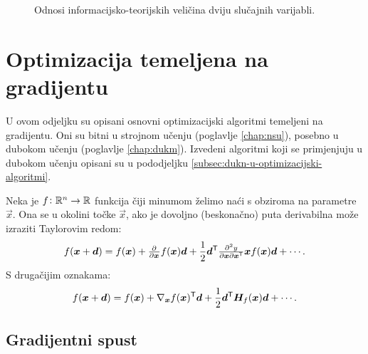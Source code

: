 \documentclass[utf8, diplomski, lmodern]{fer}
\begin{document}
\begin{figure}
\centering
{}
\caption{Odnosi informacijsko-teorijskih veličina dviju slučajnih varijabli.}
\label{fig:entropije}
\end{figure}


\section{Optimizacija temeljena na gradijentu}

U ovom odjeljku su opisani osnovni optimizacijski algoritmi temeljeni na gradijentu. Oni su bitni u strojnom učenju (poglavlje \ref{chap:nsu}), posebno u dubokom učenju (poglavlje \ref{chap:dukm}). Izvedeni algoritmi koji se primjenjuju u dubokom učenju opisani su u pododjeljku \ref{subsec:dukn-u-optimizacijski-algoritmi}.

Neka je $f \colon \mathbb{R}^n \to \mathbb{R}$ funkcija čiji minumom želimo naći s obziroma na parametre $\vec x$. Ona se u okolini točke $\vec x$, ako je dovoljno (beskonačno) puta derivabilna može izraziti Taylorovim redom:
\begin{align}
f(\vec x+\vec d) = f(\vec x) + \pd{}{\vec x}f(\vec x)\vec d + \frac{1}{2}\vec d^\tp{\tfrac{\partial^2y}{\partial\vec x\partial\vec x^\tp}}{\vec x}f(\vec x)\vec d + \cdots \text{.}
\end{align}
S drugačijim oznakama:
\begin{align} \label{eq:taylorov-red}
f(\vec x+\vec d) = f(\vec x) + \nabla_{\vec x}f(\vec x)^\tp\vec d + \frac{1}{2}\vec d^\tp\mat H_f(\vec x)\vec d + \cdots \text{.}
\end{align}

\subsection{Gradijentni spust}
\end{document}
